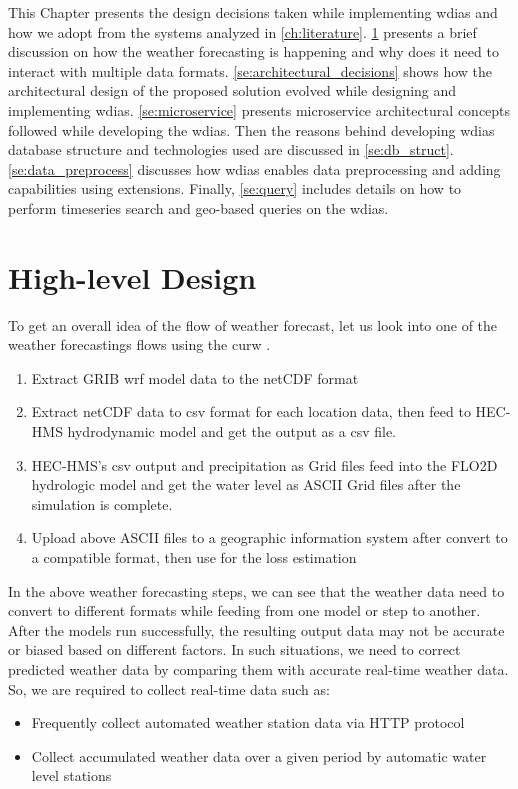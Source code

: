 This Chapter presents the design decisions taken while implementing \acrfull{wdias} and how we adopt from the systems analyzed in \ref{ch:literature}.
\cref{se:high_level_design} presents a brief discussion on how  the weather forecasting is happening and why does it need to interact with multiple data formats.
\cref{se:architectural_decisions} shows how the architectural design of the proposed solution evolved while designing and implementing \acrshort{wdias}.
\cref{se:microservice} presents microservice architectural concepts followed while developing the \acrshort{wdias}. Then the reasons behind developing \acrshort{wdias} database structure and technologies used are discussed in  \cref{se:db_struct}.
\cref{se:data_preprocess} discusses how \acrshort{wdias} enables data preprocessing and adding capabilities using extensions. Finally, \cref{se:query} includes details on how to perform timeseries search and geo-based queries on the \acrshort{wdias}.


\section{High-level Design}
\label{se:high_level_design}

To get an overall idea of the flow of weather forecast, let us look into one of the weather forecastings flows using the \acrshort{curw} \cite{CUrWSL2017SL}.

\begin{enumerate}
    \item Extract \acrshort{GRIB} \acrshort{wrf} model data to the \acrshort{netCDF} format
    \item Extract \acrshort{netCDF} data to \acrshort{csv} format for each location data, then feed to HEC-HMS hydrodynamic model and get the output as a \acrshort{csv} file.
    \item HEC-HMS's \acrshort{csv} output and precipitation as Grid files feed into the FLO2D hydrologic model and get the water level as ASCII Grid files after the simulation is complete.
    \item Upload above ASCII files to a geographic information system after convert to a compatible format, then use for the loss estimation
\end{enumerate}
    
In the above weather forecasting steps, we can see that the weather data need to convert to different formats while feeding from one model or step to another. After the models run successfully, the resulting output data may not be accurate or biased based on different factors. In such situations, we need to correct predicted weather data by comparing them with accurate real-time weather data. So, we are required to collect real-time data such as:
\begin{itemize}
    \item Frequently collect automated weather station data via HTTP protocol
    \item Collect accumulated weather data over a given period by automatic water level stations
\end{itemize}

